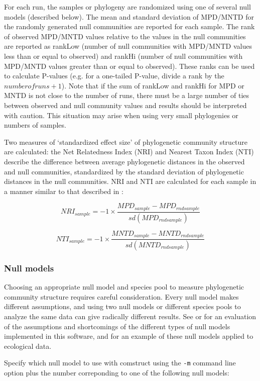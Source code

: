 \documentclass[12pt,letterpaper]{article}
\begin{document}
 For each run, the samples or phylogeny
are randomized using one of several null models (described below). The
mean and standard deviation of MPD/MNTD for the randomly generated
null communities are reported for each sample. The rank of observed
MPD/MNTD values relative to the values in the null communities are
reported as rankLow (number of null communities with MPD/MNTD values
less than or equal to observed) and rankHi (number of null communities
with MPD/MNTD values greater than or equal to observed). These ranks
can be used to calculate P-values (e.g. for a one-tailed P-value,
divide a rank by the $number of runs + 1$). Note that if the sum of
rankLow and rankHi for MPD or MNTD is not close to the number of runs,
there must be a large number of ties between observed and null
community values and results should be interpreted with caution. This
situation may arise when using very small phylogenies or numbers of
samples.

Two measures of `standardized effect size' of phylogenetic community
structure are calculated: the Net Relatedness Index (NRI) and Nearest
Taxon Index (NTI) describe the difference between average phylogenetic
distances in the observed and null communities, standardized by the
standard deviation of phylogenetic distances in the null
communities. NRI and NTI are calculated for each sample in a manner
similar to that described in \citet{webb2002phy}:

\[NRI_{sample} = -1 \times \frac{ MPD_{sample} - MPD_{rndsample} }{sd(MPD_{rndsample})}\]

\[NTI_{sample} = -1 \times \frac{ MNTD_{sample} - MNTD_{rndsample} }{sd(MNTD_{rndsample})}\] 

\subsubsection{Null models} \label{nulls}

Choosing an appropriate null model and species pool to measure phylogenetic community
structure requires careful consideration. Every null model makes
different assumptions, and using two null models or different species pools to analyze the same
data can give radically different results. See \citet{gotelli2000nul}
or \citet{gotelli1996nul} for an evaluation of the assumptions and
shortcomings of the different types of null models implemented in this
software, and \citet{kembel2006phy} for an example of these null
models applied to ecological data.

Specify which null model to use with comstruct using the \verb|-m|
command line option plus the number correponding to one of the
following null models:
\end{document}
